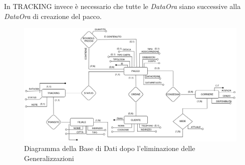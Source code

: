 In TRACKING invece è necessario che tutte le \textit{DataOra} siano successive alla \textit{DataOra} di creazione del pacco.\\
\begin{figure}[H]
\centering
\includegraphics[width=1 \textwidth]{Resources/ML.png}
\caption{Diagramma della Base di Dati dopo l'eliminazione delle Generalizzazioni}
\label{ML}
\end{figure}

